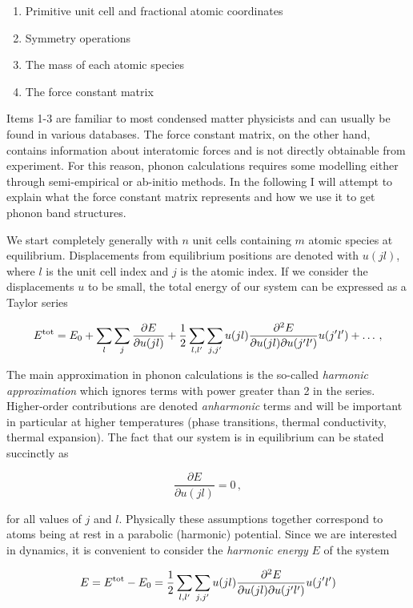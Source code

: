 \begin{enumerate}
	\item Primitive unit cell and fractional atomic coordinates
	\item Symmetry operations
	\item The mass of each atomic species
	\item The force constant matrix
\end{enumerate}

Items 1-3 are familiar to most condensed matter physicists and can usually be found in various databases. The force constant matrix, on the other hand, contains information about interatomic forces and is not directly obtainable from experiment. For this reason, phonon calculations requires some modelling either through semi-empirical or ab-initio methods. In the following I will attempt to explain what the force constant matrix represents and how we use it to get phonon band structures.

We start completely generally with $n$ unit cells containing $m$ atomic species at equilibrium. Displacements from equilibrium positions are denoted with $u(jl)$, where $l$ is the unit cell index and $j$ is the atomic index. If we consider the displacements $u$ to be small, the total energy of our system can be expressed as a Taylor series

\[ E^\text{tot} = E_0 + \sum_{l}\sum_{j} \frac{\partial E}{\partial u(jl)}  + \frac{1}{2} \sum_{l,l^\prime} \sum_{j,j^\prime} u(jl) \frac{\partial ^2 E}{\partial u(jl) \partial u(j^\prime l^\prime)} u(j^\prime l^\prime) + \dots \, , \]

The main approximation in phonon calculations is the so-called \emph{harmonic approximation} which ignores terms with power greater than 2 in the series. Higher-order contributions are denoted \emph{anharmonic} terms and will be important in particular at higher temperatures (phase transitions, thermal conductivity, thermal expansion). The fact that our system is in equilibrium can be stated succinctly as

\[ \frac{\partial E}{\partial u(jl)} = 0 \, , \]

\noindent for all values of $j$ and $l$. Physically these assumptions together correspond to atoms being at rest in a parabolic (harmonic) potential. Since we are interested in  dynamics, it is convenient to consider the \emph{harmonic energy} $E$ of the system

\begin{equation}
E = E^\text{tot} - E_0 = \frac{1}{2} \sum_{l,l^\prime} \sum_{j,j^\prime} u(jl) \frac{\partial ^2 E}{\partial u(jl) \partial u(j^\prime l^\prime)} u(j^\prime l^\prime) \label{eq:eharm}
\end{equation}


